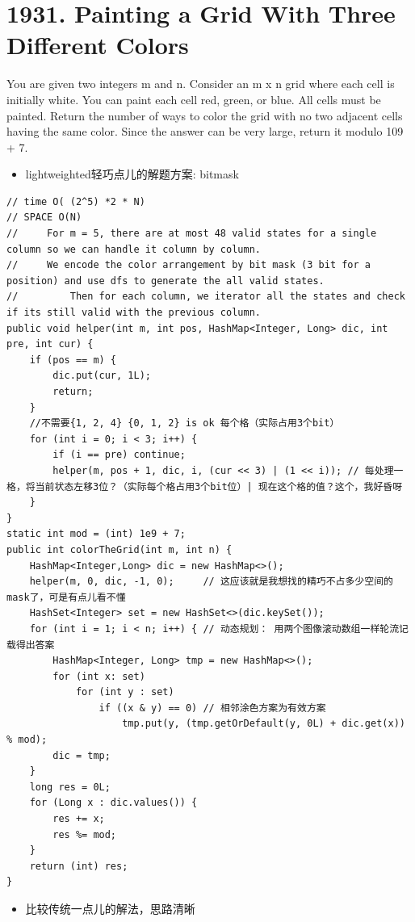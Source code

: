 \documentclass[9pt, b5paaper]{book}
\begin{document}
\section{1931. Painting a Grid With Three Different Colors}
\label{sec-1-16}
You are given two integers m and n. Consider an m x n grid where each cell is initially white. You can paint each cell red, green, or blue. All cells must be painted.
Return the number of ways to color the grid with no two adjacent cells having the same color. Since the answer can be very large, return it modulo 109 + 7.
\begin{itemize}
\item lightweighted轻巧点儿的解题方案: bitmask
\end{itemize}
\begin{verbatim}
// time O( (2^5) *2 * N)
// SPACE O(N)
//     For m = 5, there are at most 48 valid states for a single column so we can handle it column by column.
//     We encode the color arrangement by bit mask (3 bit for a position) and use dfs to generate the all valid states.
//         Then for each column, we iterator all the states and check if its still valid with the previous column.
public void helper(int m, int pos, HashMap<Integer, Long> dic, int pre, int cur) {
    if (pos == m) {
        dic.put(cur, 1L);
        return;
    }
    //不需要{1, 2, 4} {0, 1, 2} is ok 每个格（实际占用3个bit）
    for (int i = 0; i < 3; i++) {
        if (i == pre) continue; 
        helper(m, pos + 1, dic, i, (cur << 3) | (1 << i)); // 每处理一格，将当前状态左移3位？（实际每个格占用3个bit位）| 现在这个格的值？这个，我好昏呀
    }
}
static int mod = (int) 1e9 + 7;
public int colorTheGrid(int m, int n) {
    HashMap<Integer,Long> dic = new HashMap<>();
    helper(m, 0, dic, -1, 0);     // 这应该就是我想找的精巧不占多少空间的mask了，可是有点儿看不懂
    HashSet<Integer> set = new HashSet<>(dic.keySet());
    for (int i = 1; i < n; i++) { // 动态规划： 用两个图像滚动数组一样轮流记载得出答案
        HashMap<Integer, Long> tmp = new HashMap<>();
        for (int x: set) 
            for (int y : set) 
                if ((x & y) == 0) // 相邻涂色方案为有效方案
                    tmp.put(y, (tmp.getOrDefault(y, 0L) + dic.get(x)) % mod);
        dic = tmp;
    }
    long res = 0L;
    for (Long x : dic.values()) {
        res += x;
        res %= mod;
    }
    return (int) res;
}
\end{verbatim}
\begin{itemize}
\item 比较传统一点儿的解法，思路清晰
\end{itemize}
\end{document}
